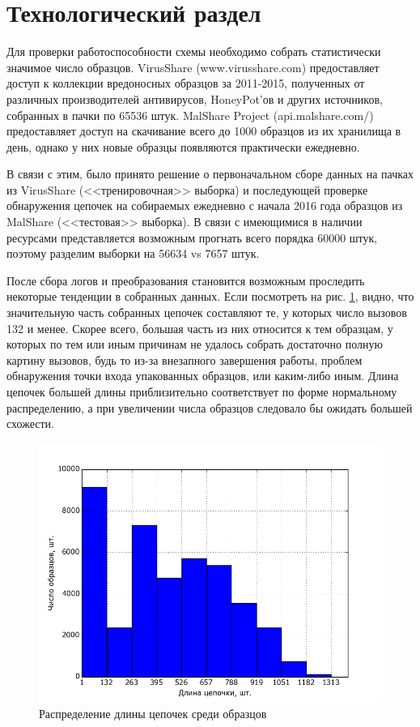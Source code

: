 \section {Технологический раздел}
Для проверки работоспособности схемы необходимо собрать статистически значимое число образцов. 
VirusShare (www.virusshare.com) предоставляет доступ к коллекции вредоносных образцов за 2011-2015, полученных от различных производителей антивирусов, HoneyPot'ов и других источников, собранных в пачки по 65536 штук.
MalShare Project (api.malshare.com/) предоставляет доступ на скачивание  всего до 1000 образцов из их хранилища в день, однако у них новые образцы появляются практически ежедневно.

В связи с этим, было принято решение о первоначальном сборе данных на пачках из VirusShare (<<тренировочная>> выборка) и последующей проверке обнаружения цепочек на собираемых ежедневно с начала 2016 года образцов из MalShare (<<тестовая>> выборка). В связи с имеющимися в наличии ресурсами представляется возможным прогнать всего порядка 60000 штук, поэтому разделим выборки на 56634 vs 7657 штук.

После сбора логов и преобразования становится возможным проследить некоторые тенденции в собранных данных. Если посмотреть на рис. \ref{fig:seq_len_hist}, видно, что значительную часть собранных цепочек составляют те, у которых число вызовов 132 и менее. Скорее всего, большая часть из них относится к тем образцам, у которых по тем или иным причинам не удалось собрать достаточно полную картину вызовов, будь то из-за внезапного завершения работы, проблем обнаружения точки входа упакованных образцов, или каким-либо иным. Длина цепочек большей длины приблизительно соответствует по форме нормальному распределению, а при увеличении числа образцов следовало бы ожидать большей схожести.

\begin {figure}[ht]
        \centering
        \includegraphics[width=\linewidth] {img/sequence_len_hist.png}
        \caption {Распределение длины цепочек среди образцов}
        \label {fig:seq_len_hist}
\end {figure}


